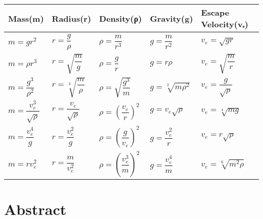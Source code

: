 \documentclass[
  letterpaper,
]{book}
\begin{document}
\begin{longtable}[]{@{}
  >{\centering\arraybackslash}p{}
  >{\centering\arraybackslash}p{}
  >{\centering\arraybackslash}p{}
  >{\centering\arraybackslash}p{}
  >{\centering\arraybackslash}p{}@{}}
\toprule\noalign{}
\begin{minipage}[b]{\linewidth}\centering
Mass(m)
\end{minipage} & \begin{minipage}[b]{\linewidth}\centering
Radius(r)
\end{minipage} & \begin{minipage}[b]{\linewidth}\centering
Density(ρ)
\end{minipage} & \begin{minipage}[b]{\linewidth}\centering
Gravity(g)
\end{minipage} & \begin{minipage}[b]{\linewidth}\centering
Escape Velocity(vₑ)
\end{minipage} \\
\midrule\noalign{}
\endhead
\bottomrule\noalign{}
\endlastfoot
\(m=gr^2\) & \(r=\dfrac{g}{\rho}\) & \(\rho=\dfrac{m}{r^3}\) &
\(g=\dfrac{m}{r^2}\) & \(v_e=\sqrt{g r}\) \\
\(m=\rho r^3\) & \(r=\sqrt{\dfrac{m}{g}}\) & \(\rho=\dfrac{g}{r}\) &
\(g=r \rho\) & \(v_e=\sqrt{\dfrac{m}{r}}\) \\
\(m=\dfrac{g^3}{\rho^2}\) & \(r=\sqrt[3]{\dfrac{m}{\rho}}\) &
\(\rho=\sqrt{\dfrac{g^3}{m}}\) & \(g=\sqrt[3]{m \rho^2}\) &
\(v_e=\dfrac{g}{\sqrt{\rho}}\) \\
\(m=\dfrac{v_e^3}{\sqrt{\rho}}\) & \(r=\dfrac{v_e}{\sqrt{\rho}}\) &
\(\rho=\left(\dfrac{v_e}{r}\right)^2\) & \(g=v_e \sqrt{\rho}\) &
\(v_e=\sqrt[4]{m g}\) \\
\(m=\dfrac{v_e^4}{g}\) & \(r=\dfrac{v_e^2}{g}\) &
\(\rho=\left(\dfrac{g}{v_e}\right)^2\) & \(g=\dfrac{v_e^2}{r}\) &
\(v_e=r \sqrt{\rho}\) \\
\(m=r v_e^2\) & \(r=\dfrac{m}{v_e^2}\) &
\(\rho=\left(\dfrac{v_e^3}{m}\right)^2\) & \(g=\dfrac{v_e^4}{m}\) &
\(v_e=\sqrt[6]{m^2 \rho}\) \\
\end{longtable}

\section{Abstract}\label{abstract-36}
\end{document}
